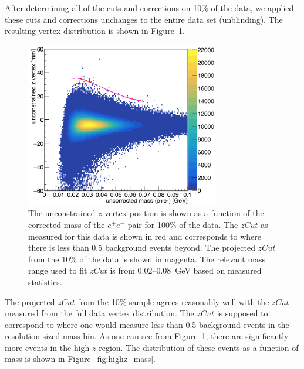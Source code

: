After determining all of the cuts and corrections on 10$\%$ of the data, we applied these cuts and corrections unchanges to the entire data set (unblinding). The resulting vertex distribution is shown in Figure~\ref{fig:zVm_ub}.

\begin{figure}[htb]
  \centering
      \includegraphics[width=0.75\textwidth]{pics/results/zVm_ub_L1L1.png}
  \caption[Vertex position vs mass for the 100$\%$ L1L1 data at 0.5~mm]{The unconstrained $z$ vertex position is shown as a function of the corrected mass of the $e^+e^-$ pair for 100$\%$ of the data. The $zCut$ as measured for this data is shown in red and corresponds to where there is less than 0.5 background events beyond. The projected $zCut$ from the 10$\%$ of the data is shown in magenta. The relevant mass range used to fit $zCut$ is from 0.02--0.08~GeV based on measured statistics.}
  \label{fig:zVm_ub}
\end{figure} 

The projected $zCut$ from the 10$\%$ sample agrees reasonably well with the $zCut$ measured from the full data vertex distribution. The $zCut$ is supposed to correspond to where one would measure less than 0.5 background events in the resolution-sized mass bin. As one can see from Figure~\ref{fig:zVm_ub}, there are significantly more events in the high $z$ region. The distribution of these events as a function of mass is shown in Figure~\ref{fig:highz_mass}.

